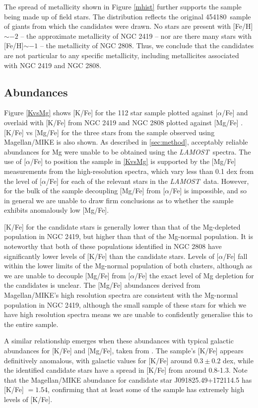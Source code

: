 \documentclass[a4paper,fleqn,usenatbib]{mnras}
\newcommand{\LamostGiants}{454180}
\newcommand{\project}[1]{\emph{#1}}
\newcommand{\lamost}{\project{LAMOST}}
\begin{document}
The spread of metallicity shown in Figure \ref{mhist} further supports the sample being made up of field stars. The distribution reflects the original \LamostGiants \ sample of giants from which the candidates were drawn.
No stars are present with [Fe/H]$\sim -2$ -- the approximate metallicity of NGC 2419 -- nor are there many stars with [Fe/H]$\sim -1$ -- the metallicity of NGC 2808. Thus, we conclude that the candidates are not particular to any specific metallicity, including metallicites associated with NGC 2419 and NGC 2808.


\subsection{Abundances}
\label{sec:abundances}
Figure \ref{KvsMg} shows [K/Fe]  for the 112 star sample plotted against $[\alpha$/Fe] and overlaid with [K/Fe] from NGC 2419 and NGC 2808 plotted against [Mg/Fe] \citep{cohenkirby2012, mucciarelli2012, mucciarelli2015}. [K/Fe] vs [Mg/Fe] for the three stars from the sample observed using Magellan/MIKE is also shown. As described in \ref{sec:method}, acceptably reliable abundances for Mg were unable to be obtained using the \lamost\ spectra. The use of $[\alpha$/Fe] to position the sample in \ref{KvsMg} is supported by the [Mg/Fe] measurements from the high-resolution spectra, which vary less than 0.1 dex from the level of $[\alpha$/Fe] for each of the relevant stars in the \lamost\ data. However, for the bulk of the sample decoupling [Mg/Fe] from $[\alpha$/Fe] is impossible, and so in general  we are unable to draw firm conclusions as to whether the sample exhibits anomalously low [Mg/Fe].

[K/Fe] for the candidate stars is generally lower than that of the Mg-depleted population in NGC 2419, but higher than that of the Mg-normal population. It is noteworthy that both of these populations identified in NGC 2808 have significantly lower levels of [K/Fe] than the candidate stars.
Levels of [$\alpha$/Fe] fall within the lower limits of the Mg-normal population of both clusters, although as we are unable to decouple [Mg/Fe] from $[\alpha$/Fe] the exact level of Mg depletion for the candidates is unclear. The [Mg/Fe] abundances derived from Magellan/MIKE's high resolution spectra are consistent with the Mg-normal population in NGC 2419, although the small sample of these stars for which we have high resolution spectra means we are unable to confidently generalise this to the entire sample.

A similar relationship emerges when these abundances with typical galactic abundances for [K/Fe] and [Mg/Fe], taken from \cite{kobayashi2011}.
The sample's [K/Fe] appears definitively anomalous, with galactic values for [K/Fe] around $0.3 \pm 0.2$ dex, while the identified candidate stars have a spread in [K/Fe] from around 0.8-1.3. Note that the Magellan/MIKE abundance for candidate star J091825.49+172114.5 has [K/Fe] $=1.54$, confirming that at least some of the sample has extremely high levels of [K/Fe].
\end{document}
